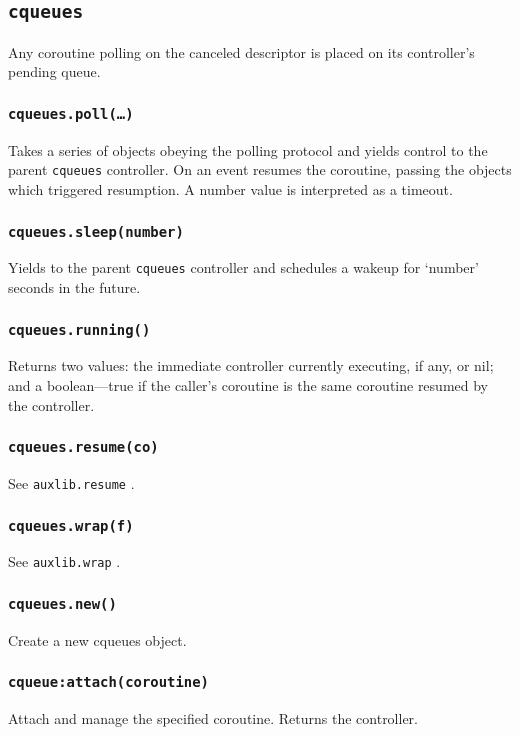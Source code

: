 \documentclass[11pt, oneside]{memoir}
\newcommand{\cqueues}[0]{\texttt{cqueues} }
\newcommand{\routine}[1]{\texttt{#1} }
\newcommand{\fn}[1]{\texttt{#1} }
\newcounter{toccols}
\newenvironment{Module}[1]{
	\subsection{\texttt{#1}}
	\addtocontents{toc}{
		\protect\begin{multicols}{\value{toccols}}
	}
}{
	\addtocontents{toc}{\protect\end{multicols}}
}
\begin{document}
\begin{Module}{\cqueues}
Any coroutine polling on the canceled descriptor is placed on its controller's pending queue.

\subsubsection[\routine{cqueues.poll}]{\routine{cqueues.poll(…)}}
Takes a series of objects obeying the polling protocol and yields control to the parent \cqueues controller. On an event resumes the coroutine, passing the objects which triggered resumption. A number value is interpreted as a timeout.

\subsubsection[\routine{cqueues.sleep}]{\routine{cqueues.sleep(number)}}

Yields to the parent \cqueues controller and schedules a wakeup for `number' seconds in the future.

\subsubsection[\routine{cqueues.running}]{\routine{cqueues.running()}}

Returns two values: the immediate controller currently executing, if any, or nil; and a boolean---true if the caller's coroutine is the same coroutine resumed by the controller.

\subsubsection[\routine{cqueues.resume}]{\routine{cqueues.resume(co)}}

See \fn{auxlib.resume}.

\subsubsection[\routine{cqueues.wrap}]{\routine{cqueues.wrap(f)}}

See \fn{auxlib.wrap}.

\subsubsection[\routine{cqueues.new}]{\routine{cqueues.new()}}
Create a new cqueues object.

\subsubsection[\routine{cqueues:attach}]{\routine{cqueue:attach(coroutine)}}
Attach and manage the specified coroutine. Returns the controller.


\end{Module}
\end{document}
